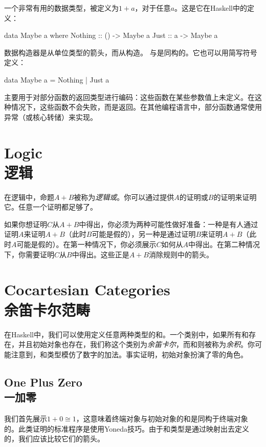 \documentclass[DaoFP]{subfiles}
\begin{document}
 一个非常有用的数据类型，被定义为$1 + a$，对于任意$a$。这是它在Haskell中的定义：
 \begin{haskell}
  data Maybe a where
  Nothing :: () -> Maybe a
  Just    ::  a -> Maybe a
 \end{haskell}
 数据构造器是从单位类型的箭头，而从构造。 与是同构的。它也可以用简写符号定义：
 \begin{haskell}
  data Maybe a = Nothing | Just a
 \end{haskell}

 主要用于对部分函数的返回类型进行编码：这些函数在某些参数值上未定义。在这种情况下，这些函数不会失败，而是返回。在其他编程语言中，部分函数通常使用异常（或核心转储）来实现。

 \section{Logic\\逻辑}

 在逻辑中，命题$A + B$被称为\emph{逻辑或}。你可以通过提供$A$的证明或$B$的证明来证明它。任意一个证明都足够了。

 如果你想证明$C$从$A+B$中得出，你必须为两种可能性做好准备：一种是有人通过证明$A$来证明$A+B$（此时$B$可能是假的），另一种是通过证明$B$来证明$A+B$（此时$A$可能是假的）。在第一种情况下，你必须展示$C$如何从$A$中得出。在第二种情况下，你需要证明$C$从$B$中得出。这些正是$A+B$消除规则中的箭头。

 \section{Cocartesian Categories\\余笛卡尔范畴}

 在Haskell中，我们可以使用定义任意两种类型的和。一个类别中，如果所有和存在，并且初始对象也存在，我们称这个类别为\emph{余笛卡尔}，而和则被称为\emph{余积}。你可能注意到，和类型模仿了数字的加法。事实证明，初始对象扮演了零的角色。

 \subsection{One Plus Zero\\一加零}

 我们首先展示$1 + 0 \cong 1$，这意味着终端对象与初始对象的和是同构于终端对象的。此类证明的标准程序是使用Yoneda技巧。由于和类型是通过映射出去定义的，我们应该比较它们的箭头。
\end{document}
